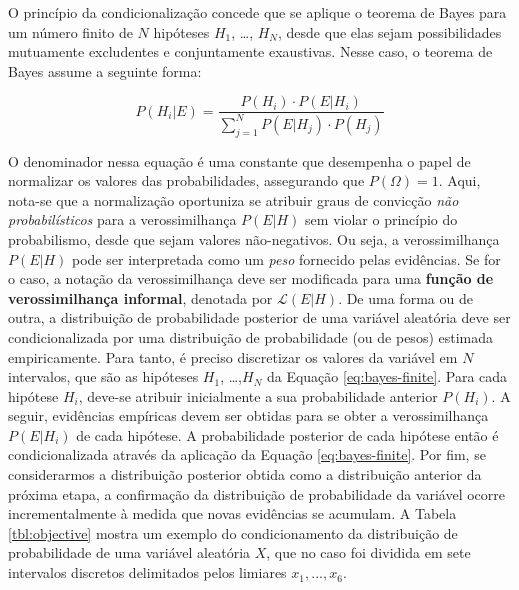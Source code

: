 \documentclass[./main.tex]{subfiles}
\begin{document}
\par O princípio da condicionalização concede que se aplique o teorema de Bayes para um número finito de $N$ hipóteses $H_1$, …, $H_N$, desde que elas sejam possibilidades mutuamente excludentes e conjuntamente exaustivas. Nesse caso, o teorema de Bayes assume a seguinte forma:
\begin{linenomath*}
\begin{equation}
\label{eq:bayes-finite}
    P(H_i | E) = \frac{P(H_i) \cdot P(E | H_i)}{\sum_{j=1}^{N}P(E | H_j) \cdot P(H_j)}
\end{equation}
\end{linenomath*}
O denominador nessa equação é uma constante que desempenha o papel de normalizar os valores das probabilidades,  assegurando que $P(\Omega) = 1$. Aqui, nota-se que a normalização oportuniza se atribuir graus de convicção \textit{não probabilísticos} para a verossimilhança $P(E | H)$ sem violar o princípio do probabilismo, desde que sejam valores não-negativos. Ou seja, a verossimilhança $P(E | H)$ pode ser interpretada como um \textit{peso} fornecido pelas evidências. Se for o caso, a notação da verossimilhança deve ser modificada para uma \textbf{função de verossimilhança informal}, denotada por $\mathcal{L}(E|H)$. De uma forma ou de outra, a distribuição de probabilidade posterior de uma variável aleatória deve ser condicionalizada por uma distribuição de probabilidade (ou de pesos) estimada empiricamente. Para tanto, é preciso discretizar os valores da variável em $N$ intervalos, que são as hipóteses $H_1$, …,$H_N$ da Equação \eqref{eq:bayes-finite}. Para cada hipótese $H_i$, deve-se atribuir inicialmente a sua probabilidade anterior $P(H_i)$. A seguir, evidências empíricas devem ser obtidas para se obter a verossimilhança $P(E | H_i)$ de cada hipótese. A probabilidade posterior de cada hipótese então é condicionalizada através da aplicação da Equação \eqref{eq:bayes-finite}. Por fim, se considerarmos a distribuição posterior obtida como a distribuição anterior da próxima etapa, a confirmação da distribuição de probabilidade da variável ocorre incrementalmente à medida que novas evidências se acumulam. A Tabela \ref{tbl:objective} mostra um exemplo do condicionamento da distribuição de probabilidade de uma variável aleatória $X$, que no caso foi dividida em sete intervalos discretos delimitados pelos limiares $x_1, ..., x_6$.
\end{document}
